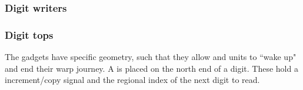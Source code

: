     \subsubsection{ Digit writers }

    \subsubsection{ Digit tops }
        The {\dtop} gadgets have specific geometry, such that they allow {\firstwarp} and
        {\secondwarp} units to ``wake up" and end their warp journey. A {\dtop} is placed on
        the north end of a digit. These hold a increment/copy signal and the regional index
        of the next digit to read.
        \vspace{1cm}

